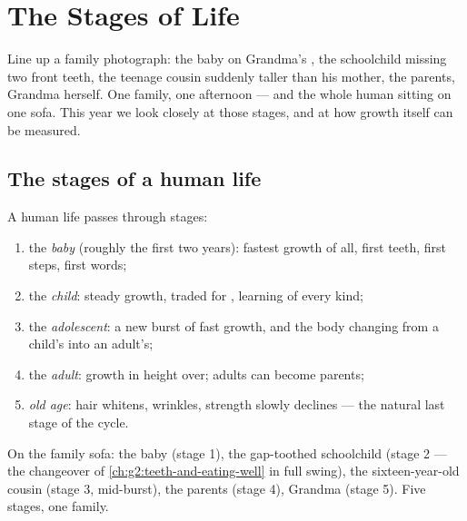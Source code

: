 \chapter{The Stages of Life}\label{ch:g3:stages-of-life}

Line up a family photograph: the baby on Grandma's , the
schoolchild missing two front teeth, the teenage cousin suddenly
taller than his mother, the parents, Grandma herself. One family,
one afternoon --- and the whole human  sitting on one
sofa. This year we look closely at those stages, and at how
growth itself can be measured.

\section{The stages of a human life}

\begin{definition}\label{def:g3:stages-of-life:stages}
A human life passes through stages:
\begin{enumerate}
  \item the \emph{baby} (roughly the first two
        years): fastest growth of all, first teeth, first steps,
        first words;
  \item the \emph{child}: steady growth, 
        traded for , learning of every kind;
  \item the \emph{adolescent}: a new burst of
        fast growth, and the body changing from a child's into an
        adult's;
  \item the \emph{adult}: growth in height over;
        adults can become parents;
  \item \emph{old age}: hair whitens, 
        wrinkles, strength slowly declines --- the natural last
        stage of the cycle.
\end{enumerate}
\end{definition}

\begin{example}\label{ex:g3:stages-of-life:sofa}
On the family sofa: the baby (stage 1), the gap-toothed
schoolchild (stage 2 --- the changeover of
\cref{ch:g2:teeth-and-eating-well} in full swing), the
sixteen-year-old cousin (stage 3, mid-burst), the parents (stage
4), Grandma (stage 5). Five stages, one family.
\end{example}


